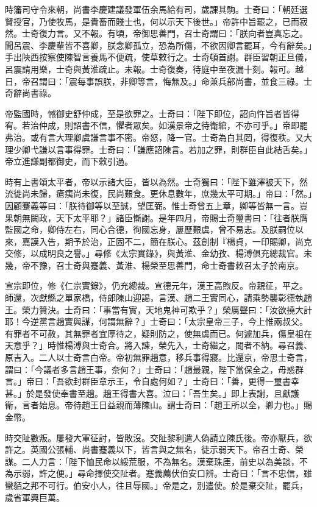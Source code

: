 \begin{pinyinscope}
時籓司守令來朝，尚書李慶建議發軍伍余馬給有司，歲課其駒。士奇曰：「朝廷選賢授官，乃使牧馬，是貴畜而賤士也，何以示天下後世。」帝許中旨罷之，已而寂然。士奇復力言。又不報。有頃，帝御思善門，召士奇謂曰：「朕向者豈真忘之。聞呂震、李慶輩皆不喜卿，朕念卿孤立，恐為所傷，不欲因卿言罷耳，今有辭矣。」手出陜西按察使陳智言養馬不便疏，使草敕行之。士奇頓首謝。群臣習朝正旦儀，呂震請用樂，士奇與黃淮疏止。未報。士奇復奏，待庭中至夜漏十刻。報可。越日，帝召謂曰：「震每事誤朕，非卿等言，悔無及。」命兼兵部尚書，並食三祿。士奇辭尚書祿。

帝監國時，憾御史舒仲成，至是欲罪之。士奇曰：「陛下即位，詔向忤旨者皆得宥。若治仲成，則詔書不信，懼者眾矣。如漢景帝之待衛綰，不亦可乎。」帝即罷弗治。或有言大理卿虞謙言事不密。帝怒，降一官。士奇為白其罔，得復秩。又大理少卿弋謙以言事得罪。士奇曰：「謙應詔陳言。若加之罪，則群臣自此結舌矣。」帝立進謙副都御史，而下敕引過。

時有上書頌太平者，帝以示諸大臣，皆以為然。士奇獨曰：「陛下雖澤被天下，然流徙尚未歸，瘡痍尚未復，民尚艱食。更休息數年，庶幾太平可期。」帝曰：「然。」因顧蹇義等曰：「朕待御等以至誠，望匡弼。惟士奇曾五上章，卿等皆無一言。豈果朝無闕政，天下太平耶？」諸臣慚謝。是年四月，帝賜士奇璽書曰：「往者朕膺監國之命，卿侍左右，同心合德，徇國忘身，屢歷艱虞，曾不易志。及朕嗣位以來，嘉謨入告，期予於治，正固不二，簡在朕心。茲創制『楊貞，一印賜卿，尚克交修，以成明良之譽。」尋修《太宗實錄》，與黃淮、金幼孜、楊溥俱充總裁官。未幾，帝不豫，召士奇與蹇義、黃淮、楊榮至思善門，命士奇書敕召太子於南京。

宣宗即位，修《仁宗實錄》，仍充總裁。宣德元年，漢王高煦反。帝親征，平之。師還，次獻縣之單家橋，侍郎陳山迎謁，言漢、趙二王實同心，請乘勢襲彰德執趙王。榮力贊決。士奇曰：「事當有實，天地鬼神可欺乎？」榮厲聲曰：「汝欲撓大計耶！今逆黨言趙實與謀，何謂無辭？」士奇曰：「太宗皇帝三子，今上惟兩叔父。有罪者不可赦，其無罪者宜厚待之，疑則防之，使無虞而已。何遽加兵，傷皇祖在天意乎？」時惟楊溥與士奇合。將入諫，榮先入，士奇繼之，閽者不納。尋召義、原吉入。二人以士奇言白帝。帝初無罪趙意，移兵事得寢。比還京，帝思士奇言，謂曰：「今議者多言趙王事，奈何？」士奇曰：「趙最親，陛下當保全之，毋惑群言。」帝曰：「吾欲封群臣章示王，令自處何如？」士奇曰：「善，更得一璽書幸甚。」於是發使奉書至趙。趙王得書大喜。泣曰：「吾生矣。」即上表謝，且獻護衛，言者始息。帝待趙王日益親而薄陳山。謂士奇曰：「趙王所以全，卿力也。」賜金幣。

時交阯數叛。屢發大軍征討，皆敗沒。交阯黎利遣人偽請立陳氏後。帝亦厭兵，欲許之。英國公張輔、尚書蹇義以下，皆言與之無名，徒示弱天下。帝召士奇、榮謀。二人力言：「陛下恤民命以綏荒服，不為無名。漢棄珠厓，前史以為美談，不為示弱，許之便。」尋命擇使交阯者。蹇義薦伏伯安口辨。士奇曰：「言不忠信，雖蠻貊之邦不可行。伯安小人，往且辱國。」帝是之，別遣使。於是棄交阯，罷兵，歲省軍興巨萬。


\end{pinyinscope}
